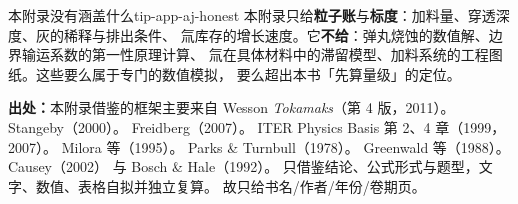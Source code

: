 \begin{tip}{本附录没有涵盖什么}{tip-app-aj-honest}
本附录只给\textbf{粒子账}与\textbf{标度}：加料量、穿透深度、灰的稀释与排出条件、
氚库存的增长速度。它\textbf{不给}：弹丸烧蚀的数值解、边界输运系数的第一性原理计算、
氚在具体材料中的滞留模型、加料系统的工程图纸。这些要么属于专门的数值模拟，
要么超出本书「先算量级」的定位。
\end{tip}

\textbf{出处：}本附录借鉴的框架主要来自 Wesson \emph{Tokamaks}（第 4 版，2011）。
Stangeby（2000）。
Freidberg（2007）。
ITER Physics Basis 第 2、4 章（1999，2007）。
Milora 等（1995）。
Parks \& Turnbull（1978）。
Greenwald 等（1988）。
Causey（2002）
与 Bosch \& Hale（1992）。
只借鉴结论、公式形式与题型，文字、数值、表格自拟并独立复算。
故只给书名/作者/年份/卷期页。
\endgroup